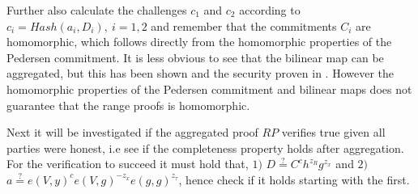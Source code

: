 Further also calculate the challenges $c_1$ and $c_2$ according to $c_i=Hash(a_i,D_i),\: i=1,2$ and remember that the  commitments $C_i$  are homomorphic, which follows directly from the homomorphic properties of the Pedersen commitment. It is less obvious to see that the bilinear map can be aggregated, but this has been shown and the security proven in \cite{aggregate_bm}. However the homomorphic properties of the Pedersen commitment and bilinear maps does not guarantee that the range proofs is homomorphic. 



Next it will be investigated if the aggregated proof $RP$ verifies true given all parties were honest, i.e see if the completeness property holds after aggregation. For the verification to succeed it must hold that, $1)$ $D\overset{?}{=} C^ch^{z_R}g^{z_x}$ and $2)$ $ a \overset{?}{=} e(V,y)^ce(V,g)^{-z_x}e(g,g)^{z_\tau}$,  hence check if it holds starting with the first.

